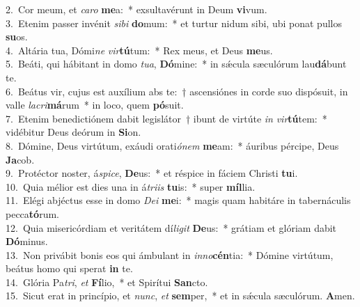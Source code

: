 {2.~}Cor meum, et \textit{ca}\textit{ro} \textbf{me}a:~* exsultavérunt in Deum \textbf{vi}vum.\\
{3.~}Etenim passer invénit \textit{si}\textit{bi} \textbf{do}mum:~* et turtur nidum sibi, ubi ponat pullos \textbf{su}os.\\
{4.~}Altária tua, Dómi\textit{ne} \textit{vir}\textbf{tú}tum:~* Rex meus, et Deus \textbf{me}us.\\
{5.~}Beáti, qui hábitant in domo \textit{tu}\textit{a}, \textbf{Dó}mine:~* in sǽcula sæculórum lau\textbf{dá}bunt te.\\
{6.~}Beátus vir, cujus est auxílium abs te:~† ascensiónes in corde suo dispósuit, in valle \textit{la}\textit{cri}\textbf{má}rum~* in loco, quem \textbf{pó}suit.\\
{7.~}Etenim benedictiónem dabit legislátor~† ibunt de virtúte \textit{in} \textit{vir}\textbf{tú}tem:~* vidébitur Deus deórum in \textbf{Si}on.\\
{8.~}Dómine, Deus virtútum, exáudi orati\textit{ó}\textit{nem} \textbf{me}am:~* áuribus pércipe, Deus \textbf{Ja}cob.\\
{9.~}Protéctor noster, á\textit{spi}\textit{ce}, \textbf{De}us:~* et réspice in fáciem Christi \textbf{tu}i.\\
{10.~}Quia mélior est dies una in á\textit{tri}\textit{is} \textbf{tu}is:~* super \textbf{míl}lia.\\
{11.~}Elégi abjéctus esse in domo \textit{De}\textit{i} \textbf{me}i:~* magis quam habitáre in tabernáculis pecca\textbf{tó}rum.\\
{12.~}Quia misericórdiam et veritátem dí\textit{li}\textit{git} \textbf{De}us:~* grátiam et glóriam dabit \textbf{Dó}minus.\\
{13.~}Non privábit bonis eos qui ámbulant in \textit{in}\textit{no}\textbf{cén}tia:~* Dómine virtútum, beátus homo qui sperat \textbf{in} te.\\
{14.~}Glória Pa\textit{tri}, \textit{et} \textbf{Fí}lio,~* et Spirítui \textbf{San}cto.\\
{15.~}Sicut erat in princípio, et \textit{nunc}, \textit{et} \textbf{sem}per,~* et in sǽcula sæculórum. \textbf{A}men.\\
